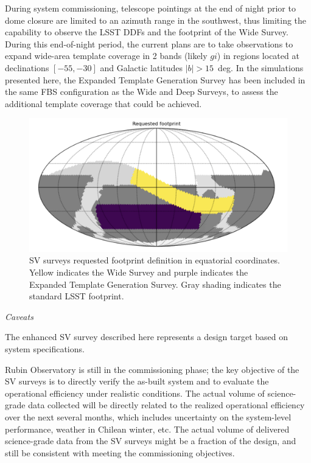 During system commissioning, telescope pointings at the end of night prior to dome closure are limited to an azimuth range in the southwest, thus limiting the capability to observe the LSST DDFs and the footprint of the Wide Survey.
During this end-of-night period, the current plans are to take observations to expand wide-area template coverage in 2 bands (likely $gi$) in regions located at declinations $[-55, -30]$ and Galactic latitudes $|b| > 15$~deg.
In the simulations presented here, the Expanded Template Generation Survey has been included in the same FBS configuration as the Wide and Deep Surveys, to assess the additional template coverage that could be achieved.

\begin{figure}[htbp]
    \begin{center}
    \includegraphics[width=1\textwidth]{./sv_surveys_requested_footprint.png}
    \caption{SV surveys requested footprint definition in equatorial coordinates. Yellow indicates the Wide Survey and purple indicates the Expanded Template Generation Survey. Gray shading indicates the standard LSST footprint.}
    \label{sv_surveys_requested_footprint}
    \end{center}
\end{figure}

\textit{Caveats}

The enhanced SV survey described here represents a design target based on system specifications.

Rubin Observatory is still in the commissioning phase; the key objective of the SV surveys is to directly verify the as-built system and to evaluate the operational efficiency under realistic conditions.
The actual volume of science-grade data collected will be directly related to the realized operational efficiency over the next several months, which includes uncertainty on the system-level performance, weather in Chilean winter, etc.
The actual volume of delivered science-grade data from the SV surveys might be a fraction of the design, and still be consistent with meeting the commissioning objectives.

